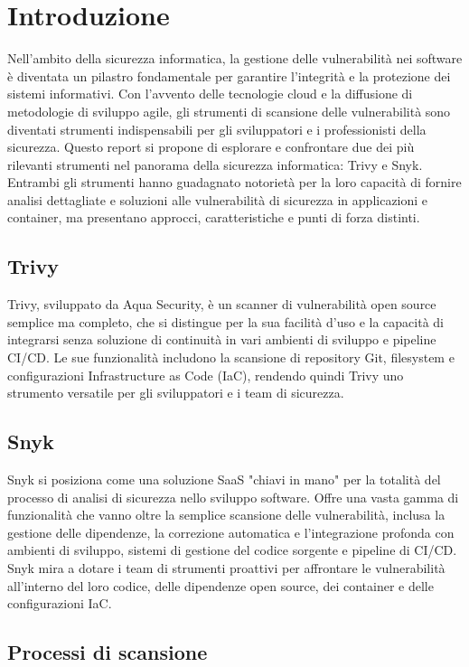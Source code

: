 \chapter{Introduzione}
Nell'ambito della sicurezza informatica, la gestione delle vulnerabilità nei software è diventata un pilastro fondamentale per garantire l'integrità e la protezione dei sistemi informativi. Con l'avvento delle tecnologie cloud e la diffusione di metodologie di sviluppo agile, gli strumenti di scansione delle vulnerabilità sono diventati strumenti indispensabili per gli sviluppatori e i professionisti della sicurezza. Questo report si propone di esplorare e confrontare due dei più rilevanti strumenti nel panorama della sicurezza informatica: Trivy e Snyk. Entrambi gli strumenti hanno guadagnato notorietà per la loro capacità di fornire analisi dettagliate e soluzioni alle vulnerabilità di sicurezza in applicazioni e container, ma presentano approcci, caratteristiche e punti di forza distinti.

\section*{Trivy}

Trivy, sviluppato da Aqua Security, è un scanner di vulnerabilità open source semplice ma completo, che si distingue per la sua facilità d'uso e la capacità di integrarsi senza soluzione di continuità in vari ambienti di sviluppo e pipeline CI/CD. Le sue funzionalità includono la scansione di repository Git, filesystem e configurazioni Infrastructure as Code (IaC), rendendo quindi Trivy uno strumento versatile per gli sviluppatori e i team di sicurezza.

\section*{Snyk}

Snyk si posiziona come una soluzione SaaS "chiavi in mano" per la totalità del processo di analisi di sicurezza nello sviluppo software. Offre una vasta gamma di funzionalità che vanno oltre la semplice scansione delle vulnerabilità, inclusa la gestione delle dipendenze, la correzione automatica e l'integrazione profonda con ambienti di sviluppo, sistemi di gestione del codice sorgente e pipeline di CI/CD. Snyk mira a dotare i team di strumenti proattivi per affrontare le vulnerabilità all'interno del loro codice, delle dipendenze open source, dei container e delle configurazioni IaC.

\section{Processi di scansione}
